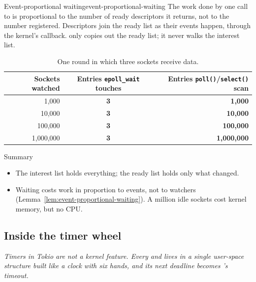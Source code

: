 \begin{lemma}{Event-proportional waiting}{event-proportional-waiting}
    The work done by one call to  is proportional to the number of ready descriptors it returns, not to the number registered.
    \why Descriptors join the ready list as their events happen, through the kernel's callback.  only copies out the ready list; it never walks the interest list.
\end{lemma}

\begin{table}[htbp]
    \centering\small
    \begin{tabular}{r c r}
        \toprule
        \textbf{Sockets watched} & \textbf{Entries \texttt{epoll\_wait} touches} & \textbf{Entries \texttt{poll()}/\texttt{select()} scan} \\
        \midrule
        1,000 & \textcolor{StmtLemma}{\textbf{3}} & \textcolor{red!70!black}{\textbf{1,000}} \\
        10,000 & \textcolor{StmtLemma}{\textbf{3}} & \textcolor{red!70!black}{\textbf{10,000}} \\
        100,000 & \textcolor{StmtLemma}{\textbf{3}} & \textcolor{red!70!black}{\textbf{100,000}} \\
        1,000,000 & \textcolor{StmtLemma}{\textbf{3}} & \textcolor{red!70!black}{\textbf{1,000,000}} \\
        \bottomrule
    \end{tabular}
    \caption{One round in which three sockets receive data.}
    \label{tab:wakers-14.1}
\end{table}

\begin{quotebox}{Summary}
    \begin{itemize}
        \item The interest list holds everything; the ready list holds only what changed.
        \item Waiting costs work in proportion to events, not to watchers (Lemma~\ref{lem:event-proportional-waiting}). A million idle sockets cost kernel memory, but no CPU.
    \end{itemize}
\end{quotebox}

\subsection{Inside the timer wheel}
\label{sec:wakers-ch15}

\textit{Timers in Tokio are not a kernel feature. Every  and  lives in a single user-space structure built like a clock with six hands, and its next deadline becomes 's timeout.}

